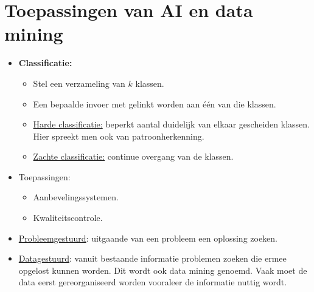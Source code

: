 \documentclass{report}
\begin{document}
\section{Toepassingen van AI en data mining}
\begin{itemize}
	\item \textbf{Classificatie:} 
	\begin{itemize}
		\item Stel een verzameling van $k$ klassen.
		\item Een bepaalde invoer met gelinkt worden aan één van die klassen.
		\item \uline{Harde classificatie:} beperkt aantal duidelijk van elkaar gescheiden klassen. Hier spreekt men ook van patroonherkenning.
		\item \uline{Zachte classificatie:} continue overgang van de klassen. 
	\end{itemize}
	\item Toepassingen:
	\begin{itemize}
		\item Aanbevelingssystemen.
		\item Kwaliteitscontrole.
	\end{itemize}
	\item \uline{Probleemgestuurd}: uitgaande van een probleem een oplossing zoeken.
	\item \uline{Datagestuurd}: vanuit bestaande informatie problemen zoeken die ermee opgelost kunnen worden. Dit wordt ook data mining genoemd. Vaak moet de data eerst gereorganiseerd worden vooraleer de informatie nuttig wordt.
\end{itemize}
\end{document}

